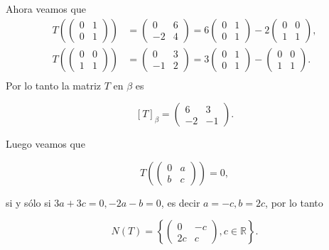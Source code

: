 \documentclass[letterpaper]{article}
\theoremstyle{definition}
\theoremstyle{lemathm}
\theoremstyle{lemademthm}
\newcommand{\R}{\mathbb{R}}
\begin{document}
\begin{enumerate}
		Ahora veamos que
		\begin{align*}
			T\left(\begin{pmatrix}
				0 & 1\\
				0 & 1
			\end{pmatrix}\right) &= \begin{pmatrix}
				0 & 6\\
				-2 & 4
			\end{pmatrix} = 6\begin{pmatrix}
				0 & 1\\
				0 & 1
			\end{pmatrix} - 2\begin{pmatrix}
				0 & 0\\
				1 & 1
			\end{pmatrix},\\
			T\left(\begin{pmatrix}
				0 & 0\\
				1 & 1
			\end{pmatrix}\right) &= \begin{pmatrix}
				0 & 3\\
				-1 & 2
			\end{pmatrix} = 3\begin{pmatrix}
				0 & 1\\
				0 & 1
			\end{pmatrix} - \begin{pmatrix}
				0 & 0\\
				1 & 1
			\end{pmatrix}.\\
		\end{align*}
		Por lo tanto la matriz $T$ en $\beta$ es

		\[[T]_\beta = \begin{pmatrix}
			6 & 3\\
			-2 & -1
		\end{pmatrix}.\]

		Luego veamos que

		\[T\left(\begin{pmatrix}
			0 & a\\
			b & c
		\end{pmatrix}\right) = 0,\]

		si y sólo si $3a + 3c = 0, -2a - b = 0$, es decir $a = -c, b = 2c$,	por lo tanto

		\[N(T) = \left\{\begin{pmatrix}
			0 & -c\\
			2c & c
		\end{pmatrix}, c \in \R \right\}.\]


\end{enumerate}
\end{document}
